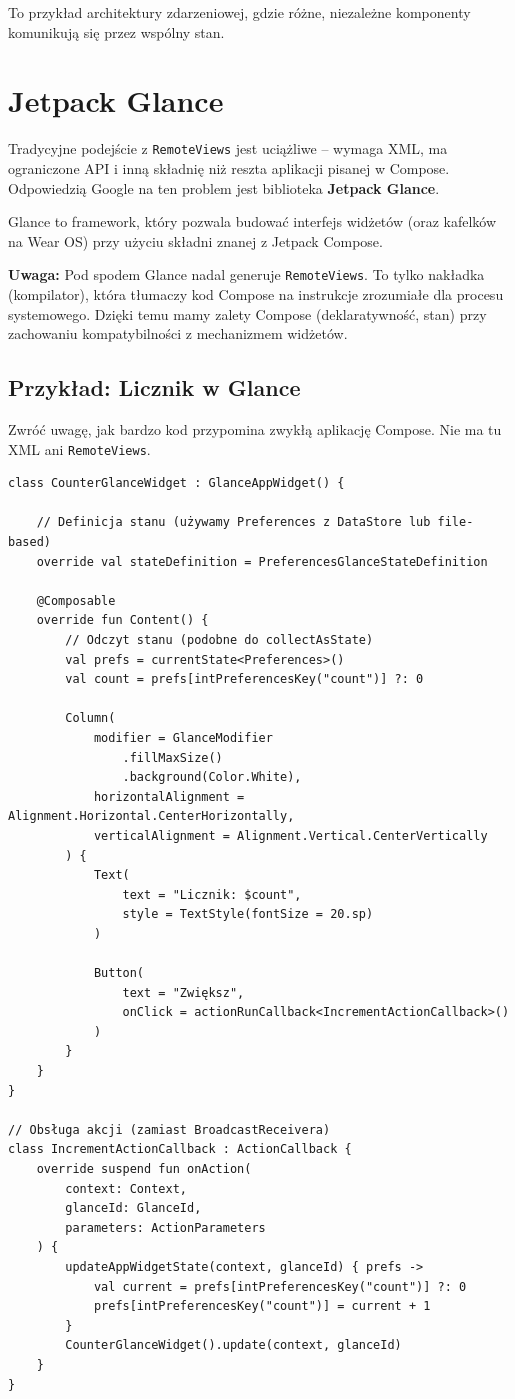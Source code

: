 To przykład architektury zdarzeniowej, gdzie różne, niezależne komponenty komunikują się przez wspólny stan.

\section{Jetpack Glance}

Tradycyjne podejście z \texttt{RemoteViews} jest uciążliwe – wymaga XML, ma ograniczone API i inną składnię niż reszta aplikacji pisanej w Compose. Odpowiedzią Google na ten problem jest biblioteka \textbf{Jetpack Glance}.

Glance to framework, który pozwala budować interfejs widżetów (oraz kafelków na Wear OS) przy użyciu składni znanej z Jetpack Compose.

\textbf{Uwaga:} Pod spodem Glance nadal generuje \texttt{RemoteViews}. To tylko nakładka (kompilator), która tłumaczy kod Compose na instrukcje zrozumiałe dla procesu systemowego. Dzięki temu mamy zalety Compose (deklaratywność, stan) przy zachowaniu kompatybilności z mechanizmem widżetów.

\subsection{Przykład: Licznik w Glance}

Zwróć uwagę, jak bardzo kod przypomina zwykłą aplikację Compose. Nie ma tu XML ani \texttt{RemoteViews}.

\begin{verbatim}
class CounterGlanceWidget : GlanceAppWidget() {

    // Definicja stanu (używamy Preferences z DataStore lub file-based)
    override val stateDefinition = PreferencesGlanceStateDefinition

    @Composable
    override fun Content() {
        // Odczyt stanu (podobne do collectAsState)
        val prefs = currentState<Preferences>()
        val count = prefs[intPreferencesKey("count")] ?: 0

        Column(
            modifier = GlanceModifier
                .fillMaxSize()
                .background(Color.White),
            horizontalAlignment = Alignment.Horizontal.CenterHorizontally,
            verticalAlignment = Alignment.Vertical.CenterVertically
        ) {
            Text(
                text = "Licznik: $count",
                style = TextStyle(fontSize = 20.sp)
            )
            
            Button(
                text = "Zwiększ",
                onClick = actionRunCallback<IncrementActionCallback>()
            )
        }
    }
}

// Obsługa akcji (zamiast BroadcastReceivera)
class IncrementActionCallback : ActionCallback {
    override suspend fun onAction(
        context: Context,
        glanceId: GlanceId,
        parameters: ActionParameters
    ) {
        updateAppWidgetState(context, glanceId) { prefs ->
            val current = prefs[intPreferencesKey("count")] ?: 0
            prefs[intPreferencesKey("count")] = current + 1
        }
        CounterGlanceWidget().update(context, glanceId)
    }
}
\end{verbatim}

